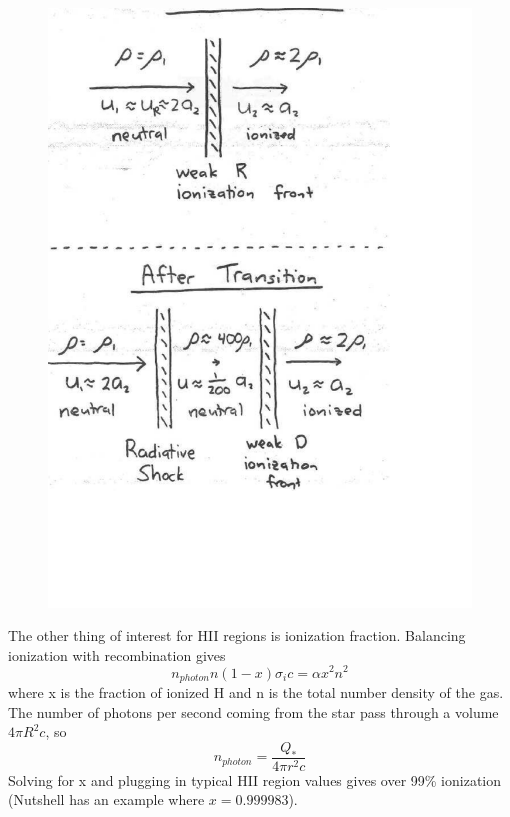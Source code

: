 \begin{figure}[!h]
\label{fig:front}
\begin{center}
\includegraphics[width=\textwidth]{shock_diagram.pdf}
\end{center}
\end{figure}

The other thing of interest for HII regions is ionization fraction.  Balancing ionization with 
recombination gives
\begin{equation}
n_{photon}n(1-x)\sigma_{i}c=\alpha x^2n^2
\end{equation}
where x is the fraction of ionized H and n is the total number density of the gas.  The number 
of photons per second coming from the star pass through a volume $4\pi R^2c$, so 
\begin{equation}
n_{photon}=\frac{Q_*}{4\pi r^2c}
\end{equation}
Solving for x and plugging in typical HII region values gives over 99\% ionization (Nutshell 
has an example where $x=0.999983$).  

